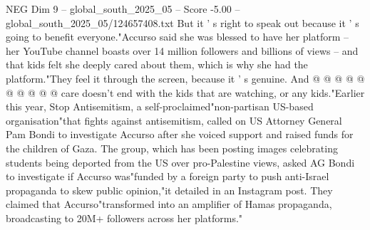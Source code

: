 \begin{textsample}{NEG Dim 9 – global\_south\_2025\_05 – Score -5.00 – global\_south\_2025\_05/124657408.txt}
But it ' s right to speak out because it ' s going to benefit everyone."Accurso said she was blessed to have her platform -- her YouTube channel boasts over 14 million followers and billions of views -- and that kids felt she deeply cared about them, which is why she had the platform."They feel it through the screen, because it ' s genuine.
And @ @ @ @ @ @ @ @ @ @ care doesn't end with the kids that are watching, or any kids."Earlier this year, Stop Antisemitism, a self-proclaimed"non-partisan US-based organisation"that fights against antisemitism, called on US Attorney General Pam Bondi to investigate Accurso after she voiced support and raised funds for the children of Gaza.
The group, which has been posting images celebrating students being deported from the US over pro-Palestine views, asked AG Bondi to investigate if Accurso was"funded by a foreign party to push anti-Israel propaganda to skew public opinion,"it detailed in an Instagram post.
They claimed that Accurso"transformed into an amplifier of Hamas propaganda, broadcasting to 20M+ followers across her platforms."

\end{textsample}
